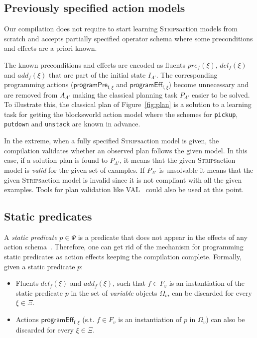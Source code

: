 \documentclass[letterpaper]{article} %
\newcommand{\strips}{\textsc{Strips}}     %
\begin{document}
\subsection{Previously specified action models}
Our compilation does not require to start learning \strips action models from scratch and accepts partially specified operator schema where some preconditions and effects are a priori known.

The known preconditions and effects are encoded as fluents $pre_f(\xi)$, $del_f(\xi)$ and $add_f(\xi)$ that are part of the initial state $I_{\Lambda'}$. The corresponding programming actions ($\mathsf{programPre_{f,\xi}}$ and $\mathsf{programEff_{f,\xi}}$) become unnecessary and are removed from $A_{\Lambda'}$ making the classical planning task $P_{\Lambda'}$ easier to be solved. To illustrate this, the classical plan of Figure~\ref{fig:plan} is a solution to a learning task for getting the blocksworld action model where the schemes for {\tt\small pickup}, {\tt\small putdown} and {\tt\small unstack} are known in advance.

In the extreme, when a fully specified \strips action model is given, the compilation validates whether an observed plan follows the given model. In this case, if a solution plan is found to $P_{\Lambda'}$, it means that the given \strips action model is {\em valid} for the given set of examples. If $P_{\Lambda'}$ is unsolvable it means that the given \strips action model is invalid since it is not compliant with all the given examples. Tools for plan validation like VAL~\cite{howey2004val} could also be used at this point.

\subsection{Static predicates}
A {\em static predicate} $p \in \Psi$ is a predicate that does not appear in the effects of any action schema~\cite{fox:TIM:JAIR1998}. Therefore, one can get rid of the mechanism for programming static predicates as action effects keeping the compilation complete. Formally, given a static predicate $p$:
\begin{itemize}
\item Fluents $del_f(\xi)$ and $add_f(\xi)$, such that $f\in F_v$ is an instantiation of the static predicate $p$ in the set of {\em variable} objects $\Omega_v$, can be discarded for every $\xi\in\Xi$.
\item Actions $\mathsf{programEff_{f,\xi}}$ (s.t. $f\in F_v$ is an instantiation of $p$ in $\Omega_v$) can also be discarded for every $\xi\in\Xi$.
\end{itemize}
\end{document}
